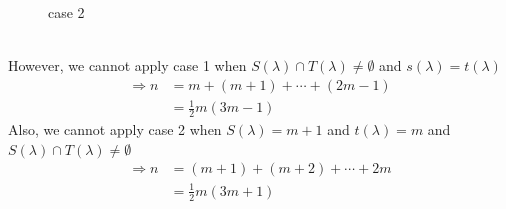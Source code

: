 \documentclass{article}
\theoremstyle{definition}
\newenvironment{pf*}{\pushQED{\qed}\pf}{\popQED\endpf}
\begin{document}
\begin{pf*}
\begin{figure}[!h]
        \caption{case 2}
        \label{diag2} 
    \end{figure}
    \\
    However, we cannot apply case 1 when $S(\lambda) \cap T(\lambda) \ne \emptyset$
    and $s(\lambda) = t(\lambda)$ 
    \begin{align*}
        \Rightarrow n &= m + (m+ 1) + \cdots + (2m-1) \\
        &= \frac{1}{2}m (3m-1)
    \end{align*}
    Also, we cannot apply case 2 when $S(\lambda) = m + 1$ and $t(\lambda) = m$ 
    and $S(\lambda) \cap T(\lambda) \ne \emptyset$
    \begin{align*}
        \Rightarrow n &= (m+1) + (m+2) + \cdots + 2m \\ 
        &= \frac{1}{2}m (3m+1)
    \end{align*}
\end{pf*}
\end{document}
